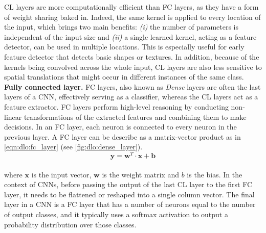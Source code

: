 \ac{CL} layers are more computationally efficient than \ac{FC} layers, as they
have a form of weight sharing baked in. Indeed, the same kernel is applied to
every location of the input, which brings two main benefits: \emph{(i)} the
number of parameters is independent of the input size and \emph{(ii)} a single
learned kernel, acting as a feature detector, can be used in multiple locations.
This is especially useful for early feature detector that detects basic shapes
or textures. In addition, because of the kernels being convolved across the
whole input, \ac{CL} layers are also less sensitive to spatial translations that
might occur in different instances of the same class.\\

\noindent \textbf{Fully connected layer.} \ac{FC} layers, also known as
\emph{Dense} layers are often the last layers of a \ac{CNN}, effectively serving
as a classifier, whereas the \ac{CL} layers act as a feature extractor.
\ac{FC} layers perform high-level reasoning by conducting non-linear
transformations of the extracted features and combining them to make decisions.
In an FC layer, each neuron is connected to every neuron in the previous layer.
A \ac{FC} layer can be describe as a matrix-vector product as in
\cref{eqn:dlo:fc_layer} (see \cref{fig:dlo:dense_layer}).\\

\begin{equation}
  \label{eqn:dlo:fc_layer}
  \mathbf{y} = \mathbf{w}^T \cdot \mathbf{x} + \mathbf{b}
\end{equation}\\

\noindent where $\mathbf{x}$ is the input vector, $\mathbf{w}$ is the weight
matrix and $b$ is the bias. In the context of \acp{CNN}, before passing the
output of the last \ac{CL} layer to the first \ac{FC} layer, it needs to be
flattened or reshaped into a single column vector. The final layer in a \ac{CNN}
is a \ac{FC} layer that has a number of neurons equal to the number of output
classes, and it typically uses a softmax activation to output a probability
distribution over those classes.\\



